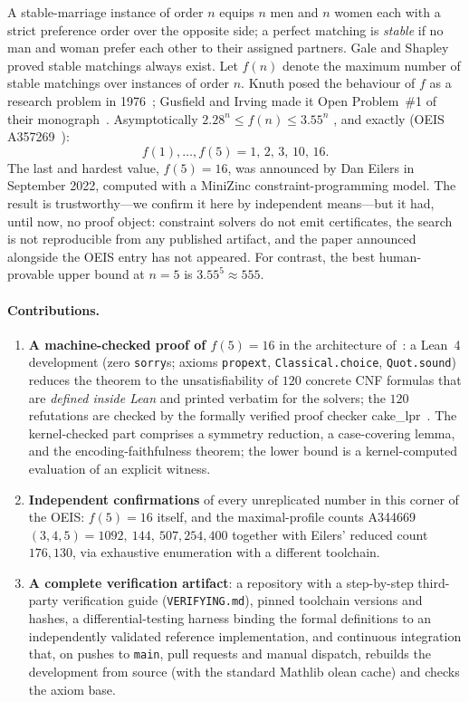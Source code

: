 \documentclass[11pt]{article}
\begin{document}
A stable-marriage instance of order $n$ equips $n$ men and $n$ women each with a strict
preference order over the opposite side; a perfect matching is \emph{stable} if no man and woman
prefer each other to their assigned partners. Gale and Shapley proved stable matchings always
exist. Let $f(n)$ denote the maximum number of stable matchings over instances of order $n$.
Knuth posed the behaviour of $f$ as a research problem in 1976~\cite{knuth}; Gusfield and Irving
made it Open Problem~\#1 of their monograph~\cite{gi89}. Asymptotically
$2.28^n \le f(n) \le 3.55^n$ \cite{thurber,kow,pp}, and exactly (OEIS A357269~\cite{oeis}):
\[
f(1),\dots,f(5) = 1,\,2,\,3,\,10,\,16.
\]
The last and hardest value, $f(5)=16$, was announced by Dan Eilers in September 2022, computed
with a MiniZinc constraint-programming model. The result is trustworthy---we confirm it here by
independent means---but it had, until now, no proof object: constraint solvers do not emit
certificates, the search is not reproducible from any published artifact, and the paper announced
alongside the OEIS entry has not appeared. For contrast, the best human-provable upper bound at
$n=5$ is $3.55^5 \approx 555$.

\paragraph{Contributions.}
\begin{enumerate}
\item \textbf{A machine-checked proof of $f(5)=16$} in the architecture of~\cite{hexagon}:
  a Lean~4 development (zero \texttt{sorry}s; axioms \texttt{propext},
  \texttt{Classical.choice}, \texttt{Quot.sound}) reduces the theorem to the unsatisfiability of
  $120$ concrete CNF formulas that are \emph{defined inside Lean} and printed verbatim for the
  solvers; the $120$ refutations are checked by the formally verified proof checker
  \textsf{cake\_lpr}~\cite{cakelpr}. The kernel-checked part comprises a symmetry reduction, a
  case-covering lemma, and the encoding-faithfulness theorem; the lower bound is a
  kernel-computed evaluation of an explicit witness.
\item \textbf{Independent confirmations} of every unreplicated number in this corner of the
  OEIS: $f(5)=16$ itself, and the maximal-profile counts
  A344669$(3,4,5) = 1092,\ 144,\ 507{,}254{,}400$ together with Eilers' reduced count
  $176{,}130$, via exhaustive enumeration with a different toolchain.
\item \textbf{A complete verification artifact}: a repository with a step-by-step third-party
  verification guide (\texttt{VERIFYING.md}), pinned toolchain versions and hashes, a
  differential-testing harness binding the formal definitions to an independently validated
  reference implementation, and continuous integration that, on pushes to \texttt{main}, pull
  requests and manual dispatch, rebuilds the development from source (with the standard Mathlib
  olean cache) and checks the axiom base.
\end{enumerate}
\end{document}
